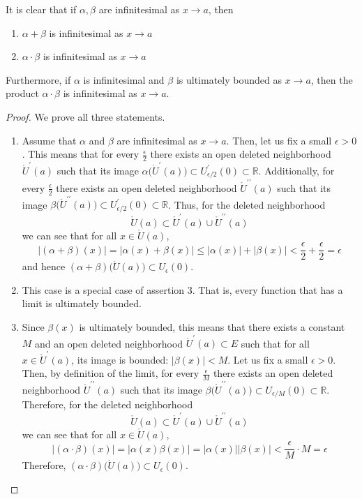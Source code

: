 \documentclass{article}
\begin{document}
    \begin{lemma}
      It is clear that if $\alpha, \beta$ are infinitesimal as $x \rightarrow a$, then 
      \begin{enumerate}
        \item $\alpha + \beta$ is infinitesimal as $x \rightarrow a$
        \item $\alpha \cdot \beta$ is infinitesimal as $x \rightarrow a$
      \end{enumerate}
      Furthermore, if $\alpha$ is infinitesimal and $\beta$ is ultimately bounded as $x \rightarrow a$, then the product $\alpha \cdot \beta$ is infinitesimal as $x \rightarrow a$. 
    \end{lemma}
    \begin{proof}
    We prove all three statements. 
    \begin{enumerate}
      \item Assume that $\alpha$ and $\beta$ are infinitesimal as $x \rightarrow a$. Then, let us fix a small $\epsilon>0$. This means that for every $\frac{\epsilon}{2}$ there exists an open deleted neighborhood $\mathring{U}^\prime (a)$ such that its image $\alpha\big(\mathring{U}^\prime (a)\big)\subset U^\prime_{\epsilon/2} (0) \subset \mathbb{R}$. Additionally, for every $\frac{\epsilon}{2}$ there exists an open deleted neighborhood $\mathring{U}^{\prime\prime} (a)$ such that its image $\beta\big(\mathring{U}^{\prime\prime} (a)\big)\subset U^\prime_{\epsilon/2} (0) \subset \mathbb{R}$.
      Thus, for the deleted neighborhood 
      \[\mathring{U}(a) \subset \mathring{U}^\prime (a) \cup \mathring{U}^{\prime\prime} (a)\]
      we can see that for all $x \in \mathring{U}(a)$, 
      \[|(\alpha + \beta)(x)| = |\alpha (x) + \beta(x)| \leq |\alpha (x)| + |\beta(x)| < \frac{\epsilon}{2} + \frac{\epsilon}{2} = \epsilon\]
      and hence $(\alpha + \beta)\big( \mathring{U}(a)\big) \subset U_\epsilon (0)$. 
      \item This case is a special case of assertion 3. That is, every function that has a limit is ultimately bounded. 
      \item Since $\beta(x)$ is ultimately bounded, this means that there exists a constant $M$ and an open deleted neighborhood $\mathring{U}^\prime (a) \subset E$ such that for all $x \in \mathring{U}^\prime (a)$, its image is bounded: $|\beta(x)|<M$. Let us fix a small $\epsilon>0$. Then, by definition of the limit, for every $\frac{\epsilon}{M}$ there exists an open deleted neighborhood $\mathring{U}^{\prime\prime} (a)$ such that its image $\beta\big(\mathring{U}^{\prime\prime}(a)\big) \subset U_{\epsilon/M} (0) \subset \mathbb{R}$. Therefore, for the deleted neighborhood
      \[\mathring{U}(a) \subset \mathring{U}^\prime (a) \cup \mathring{U}^{\prime\prime}(a)\]
      we can see that for all $x \in \mathring{U} (a)$, 
      \[|(\alpha \cdot \beta)(x)| = |\alpha (x) \beta(x)| = |\alpha (x)| |\beta(x)| < \frac{\epsilon}{M} \cdot M = \epsilon\]
      Therefore, $(\alpha \cdot \beta)\big( \mathring{U} (a)\big) \subset U_\epsilon (0)$. 
    \end{enumerate}
    \end{proof}
\end{document}
